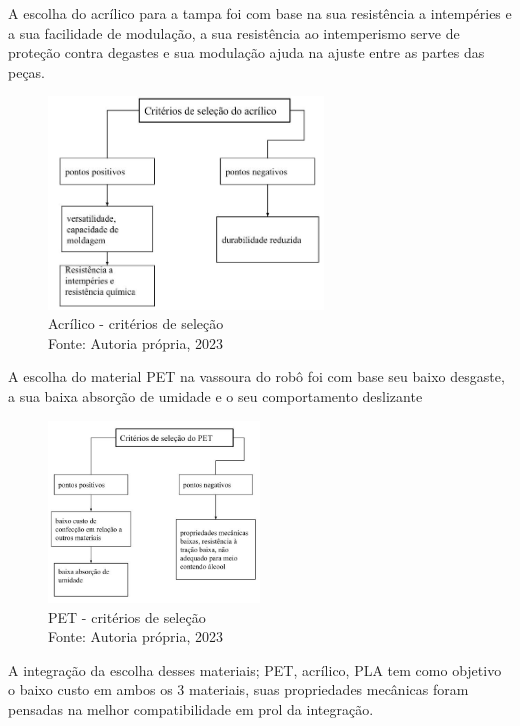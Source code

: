 A escolha do acrílico para a tampa foi com base na sua resistência a intempéries e a sua facilidade de modulação, a sua resistência ao intemperismo serve de proteção contra degastes e sua modulação ajuda na ajuste entre as partes das peças.
 \begin{figure}[h]
\begin{center}
\includegraphics[width=0.65\textwidth]{figuras/acri_crite.jpg}
\caption{Acrílico - critérios de seleção\\Fonte: Autoria própria, 2023}
\label{tampa}
\end{center}
\end{figure}
\newpage
\pagebreak
A escolha do material PET na vassoura do robô foi com base seu baixo desgaste, a sua baixa absorção de umidade e o seu comportamento deslizante
\\
 \begin{figure}[h]
\begin{center}
\includegraphics[width=0.5\textwidth]{figuras/pet_diagrama.jpg}
\caption{PET - critérios de seleção\\Fonte: Autoria própria, 2023}
\label{tampa}
\end{center}
\end{figure}

A integração da escolha desses materiais; PET, acrílico, PLA tem como objetivo o baixo custo em ambos os 3 materiais, suas propriedades mecânicas foram pensadas na melhor compatibilidade em prol da integração.

